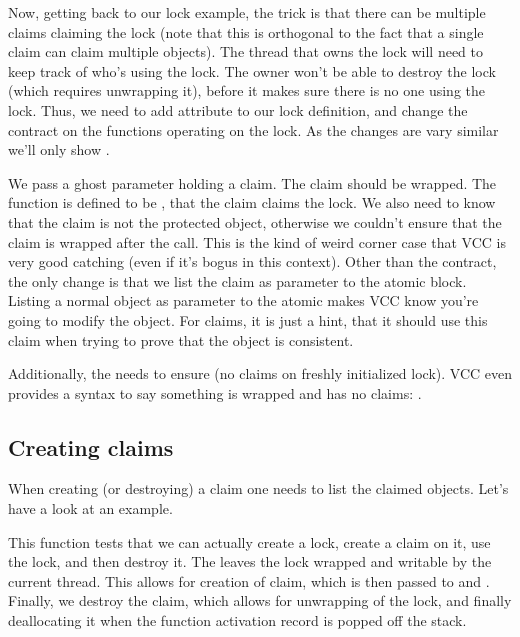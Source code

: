 Now, getting back to our lock example, the trick is that there can be
multiple claims claiming the lock (note that this is orthogonal to
the fact that a single claim can claim multiple objects).
The thread that owns the lock will need to keep track of who's using
the lock.
The owner won't be able to destroy the lock (which requires unwrapping it),
before it makes sure there is no one using the lock.
Thus, we need to add  attribute to our lock
definition, and change the contract on the functions operating
on the lock. As the changes are vary similar we'll only
show .


\noindent
We pass a ghost parameter holding a claim.
The claim should be wrapped.
The function  is defined to be
, \ie that the claim claims the lock.
We also need to know that the claim is not the protected object,
otherwise we couldn't ensure that the claim is wrapped after the call.
This is the kind of weird corner case that VCC is very good catching
(even if it's bogus in this context).
Other than the contract, the only change is that we list the claim
as parameter to the atomic block.
Listing a normal object as parameter to the atomic makes VCC know you're
going to modify the object.
For claims, it is just a hint, that it should use this claim when trying
to prove that the object is consistent.

Additionally, the  needs to ensure 
(\ie no claims on freshly initialized lock).
VCC even provides a syntax to say something is wrapped and has no claims: .

\subsection{Creating claims}
\label{sect:creating-claims}

When creating (or destroying) a claim one needs to list the claimed objects.
Let's have a look at an example.


This function tests that we can actually create a lock, create a claim on it,
use the lock, and then destroy it.
The  leaves the lock wrapped and writable by the current thread.
This allows for creation of claim, which is then passed to  and .
Finally, we destroy the claim, which allows for unwrapping of the lock, and finally deallocating
it when the function activation record is popped off the stack.

